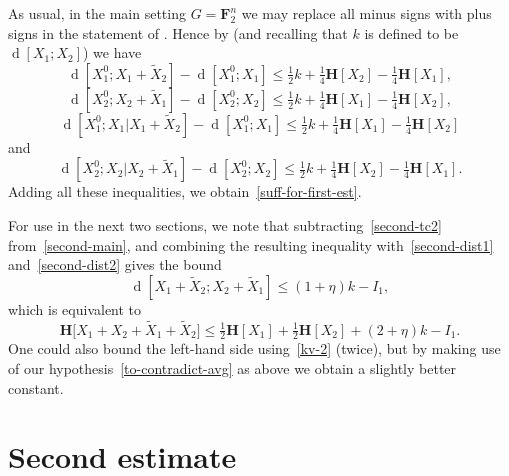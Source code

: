 \documentclass[12pt,reqno,tbtags]{amsart}
\theoremstyle{definition}
\theoremstyle{remark}
\renewcommand{\leq}{\leqslant}
\renewcommand{\le}{\leq}
\def\F{\mathbf{F}}
\newcommand{\ent}[1]{\mathbf{H}[#1]}
\newcommand{\bigH}[1]{\mathbf{H}\big[#1\big]}
\newcommand{\dist}[2]{{\operatorname{d}[#1;#2]}} %
\numberwithin{equation}{section}
\begin{document}
As usual, in the main setting $G=\F_2^n$ we may replace all minus signs with plus signs in the statement of .
Hence by  (and recalling that $k$ is defined to be $\dist{X_1}{X_2}$) we have
\[ \dist{X^0_1}{X_1+\tilde X_2} - \dist{X^0_1}{X_1} \leq \tfrac{1}{2} k + \tfrac{1}{4} \ent{X_2} - \tfrac{1}{4} \ent{X_1},\] \[  \dist{X^0_2}{X_2+\tilde X_1} - \dist{X^0_2}{X_2} \leq \tfrac{1}{2} k + \tfrac{1}{4} \ent{X_1} - \tfrac{1}{4} \ent{X_2},\]
\begin{equation}  \dist{X_1^0}{X_1|X_1+\tilde X_2} - \dist{X_1^0}{X_1} \leq \tfrac{1}{2} k + \tfrac{1}{4} \ent{X_1} - \tfrac{1}{4} \ent{X_2}
                                 \label{second-dist1}
\end{equation}
and
\begin{equation}
  \label{second-dist2}
  \dist{X_2^0}{X_2|X_2+\tilde X_1} - \dist{X_2^0}{X_2} \leq \tfrac{1}{2}k + \tfrac{1}{4} \ent{X_2} - \tfrac{1}{4} \ent{X_1}.
\end{equation}
Adding all these inequalities, we obtain~\eqref{suff-for-first-est}.

For use in the next two sections, we note that subtracting~\eqref{second-tc2} from~\eqref{second-main}, and combining the resulting inequality with~\eqref{second-dist1} and~\eqref{second-dist2} gives the bound
\[
  \dist{X_1+\tilde X_2}{X_2+\tilde X_1} \le (1 + \eta) k - I_1,
\]
which is equivalent to
\begin{equation}
  \label{HS-bound}
  \bigH{X_1+X_2+\tilde X_1+\tilde X_2} \le \tfrac{1}{2} \ent{X_1}+\tfrac{1}{2} \ent{X_2} + (2 + \eta) k - I_1.
\end{equation}
One could also bound the left-hand side using~\eqref{kv-2} (twice), but by making use of our hypothesis~\eqref{to-contradict-avg} as above we obtain a slightly better constant.


\section{Second estimate}\label{second}
\end{document}
